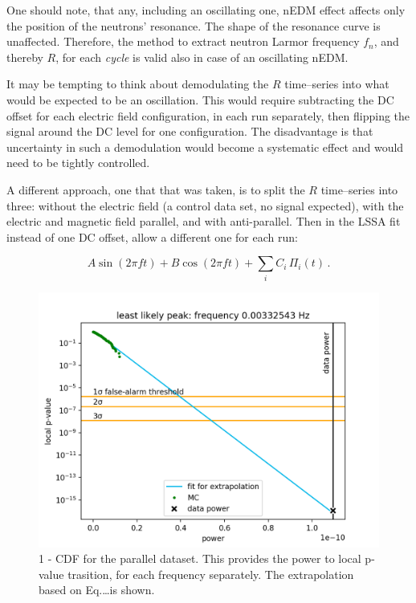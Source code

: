 One should note, that any, including an oscillating one, nEDM effect affects only the position of the neutrons' resonance. The shape of the resonance curve is unaffected. Therefore, the method to extract neutron Larmor frequency $f_n$, and thereby $R$, for each \emph{cycle} is valid also in case of an oscillating nEDM.

It may be tempting to think about demodulating the $R$ time--series into what would be expected to be an oscillation. This would require subtracting the DC offset for each electric field configuration, in each run separately, then flipping the signal around the DC level for one configuration.  The disadvantage is that uncertainty in such a demodulation would become a systematic effect and would need to be tightly controlled.

A different approach, one that that was taken, is to split the $R$ time--series into three: without the electric field (a control data set, no signal expected), with the electric and magnetic field parallel, and with anti-parallel. Then in the LSSA fit instead of one DC offset, allow a different one for each run:

\begin{equation}
  A\sin(2 \pi f t) + B\cos(2 \pi f t) + \sum_i C_i\,\Pi_i(t) \, .
\end{equation}








\begin{figure}
  \centering \includegraphics[width=\linewidth]{gfx/axions/P_best_signal_candidate.png}
  \caption{1 - CDF for the parallel dataset. This provides the power to local p-value trasition, for each frequency separately. The extrapolation based on Eq.\ldots is shown.}
  \label{fig:P_best_signal_candidate}
\end{figure}

